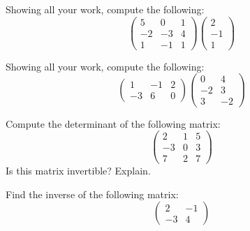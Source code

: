\documentclass[11pt,letterpaper]{article}
\begin{document}
\newpage





 Showing all your work, compute the following:
	\[
	\begin{pmatrix}
	5 & 0 & 1 \\
	-2 & -3 & 4 \\
	1 & -1 & 1
	\end{pmatrix}
	\begin{pmatrix}
	2 \\
	-1 \\
	1
	\end{pmatrix}
	\]





\newpage





 Showing all your work, compute the following:
	\[
	\begin{pmatrix}
	1 & -1 & 2 \\
	-3 & 6 & 0
	\end{pmatrix}
	\begin{pmatrix}
	0 & 4 \\
	-2 & 3 \\
	3 & -2
	\end{pmatrix}
	\]





\newpage





 Compute the determinant of the following matrix:
	\[
	\begin{pmatrix}
	2 & 1 & 5 \\
	-3 & 0 & 3 \\
	7 & 2 & 7 
	\end{pmatrix}
	\]
Is this matrix invertible? Explain. 





\newpage





 Find the inverse of the following matrix:
	\[
	\begin{pmatrix}
	2 & -1 \\
	-3 & 4
	\end{pmatrix}
	\]
\end{document}
